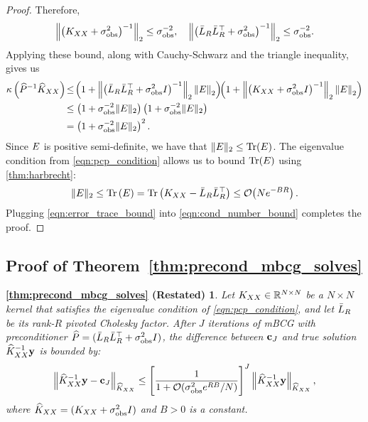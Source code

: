 \begin{proof}
  Therefore,
  \[
    \left\Vert \left(K_{XX} + \sigma^2_\text{obs} \right)^{-1} \right\Vert_2 \leq \sigma^{-2}_\text{obs},
    \quad
    \left\Vert \left(\bar{L}_R \bar{L}_R^\top + \sigma^2_\text{obs} \right)^{-1} \right\Vert_2 \leq \sigma^{-2}_\text{obs}.
  \]
  Applying these bound, along with Cauchy-Schwarz and the triangle inequality, gives us
  \begin{align}
    \kappa \left( \widehat{P}^{-1}\widehat{K}_{XX} \right) \!
    &\leq \! \left( 1 + \left\Vert \left( \bar{L}_R \bar{L}_R^\top + \sigma^2_\text{obs} I \right)^{-1} \right\Vert_2 \left\Vert E \right\Vert_{2} \right)
      \!\!
      \left( 1 + \left\Vert \left( K_{XX} + \sigma^2_\text{obs} I \right)^{-1} \right\Vert_2 \left\Vert E \right\Vert_{2} \right)
    \nonumber \\
    &\leq
    \left( 1 + \sigma^{-2}_\text{obs} \Vert E \Vert_2 \right)
    \left( 1 + \sigma^{-2}_\text{obs} \Vert E \Vert_2 \right)
    \nonumber \\
    &= \left( 1 + \sigma^{-2}_\text{obs} \Vert E \Vert_2 \right)^2.
    \label{eqn:cond_number_bound}
  \end{align}
  Since $E$ is positive semi-definite, we have that $\Vert \bE \Vert_2 \leq \tr{\bE}$.
  The eigenvalue condition from \cref{eqn:pcp_condition} allows us to bound $\tr{\bE}$ using \cref{thm:harbrecht}:
  \begin{equation}
    \Vert \bE \Vert_2 \leq \tr{\bE}
    =
    \tr{ \bK_{\bX\bX} - \bar\bL_R \bar\bL_R^\top } \leq \bigo{N e^{-BR}}.
    \label{eqn:error_trace_bound}
  \end{equation}
  Plugging \cref{eqn:error_trace_bound} into \cref{eqn:cond_number_bound} completes the proof.
\end{proof}




\subsection{Proof of Theorem~\ref{thm:precond_mbcg_solves}}
\newtheorem*{thm:precond_mbcg_solves}{\cref{thm:precond_mbcg_solves} (Restated)}
\begin{thm:precond_mbcg_solves}
  Let $K_{XX} \in \mathbb{R}^{N \times N}$ be a $N \times N$ kernel that satisfies the eigenvalue condition of \cref{eqn:pcp_condition},
	and let $\bar{L}_R$ be its rank-$R$ pivoted Cholesky factor.
	After $J$ iterations of mBCG with preconditioner $\widehat{P} = (\bar{L}_R \bar{L}_R^\top + \sigma_\text{obs}^2 I)$,
	the difference between $\mathbf{c}_J$ and true solution $\widehat{K}_{XX}^{-1} \mathbf{y}$ is bounded by:
  \begin{equation*}
    \left \Vert \trainK^{-1} \by - \bc_{J} \right \Vert_{\trainK}
    \leq \Bigg[ \frac 1 {1 + \bigo{\sigma^{2}_\text{obs} e^{RB}/N}} \Bigg]^{J}
    \left \Vert \trainK^{-1} \by \right \Vert_{\trainK},
		\nonumber
  \end{equation*}
	where $\widehat{K}_{XX} = (K_{XX} + \sigma^2_\text{obs} I)$ and $B > 0$ is a constant.
\end{thm:precond_mbcg_solves}

